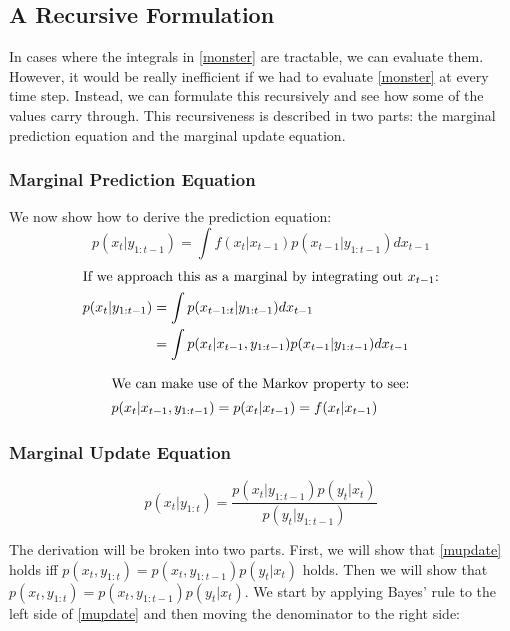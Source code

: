 \documentclass{article}
\begin{document}

\subsection{A Recursive Formulation}
In cases where the integrals in \eqref{monster} are tractable, we can evaluate them. However, it would be really inefficient if we had to evaluate \eqref{monster} at every time step. Instead, we can formulate this recursively and see how some of the values carry through. This recursiveness is described in two parts: the marginal prediction equation and the marginal update equation.

\subsubsection{Marginal Prediction Equation}
We now show how to derive the prediction equation:
\begin{equation} \label{mpredict}
p(x_t|y_{1:t-1}) = \int f(x_t|x_{t-1})p(x_{t-1}|y_{1:t-1}) dx_{t-1}
\end{equation}
\begin{align*}
\intertext{If we approach this as a marginal by integrating out $x_{t-1}$:}
p(x_t|y_{1:t-1}) &= \int p(x_{t-1:t}|y_{1:t-1}) dx_{t-1}\\
&= \int p(x_t|x_{t-1},y_{1:t-1})p(x_{t-1}|y_{1:t-1}) dx_{t-1}\\
\end{align*}

\begin{align*}
\intertext{We can make use of the Markov property to see:}
p(x_t|x_{t-1},y_{1:t-1}) &= p(x_t|x_{t-1}) = f(x_t|x_{t-1})
\end{align*}

\subsubsection{Marginal Update Equation}
\begin{equation} \label{mupdate}
p(x_t|y_{1:t}) = \frac{p(x_t|y_{1:t-1})p(y_t|x_t)}{p(y_t|y_{1:t-1})}
\end{equation}

The derivation will be broken into two parts. First, we will show that \eqref{mupdate} holds iff $p(x_t,y_{1:t}) = p(x_t,y_{1:t-1})p(y_t|x_t)$ holds. Then we will show that $p(x_t,y_{1:t}) = p(x_t,y_{1:t-1})p(y_t|x_t)$. We start by applying Bayes' rule to the left side of \eqref{mupdate} and then moving the denominator to the right side:
\end{document}

